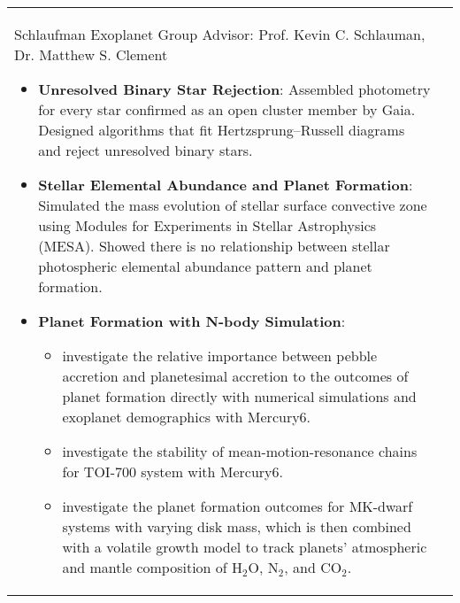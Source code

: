 \documentclass[10pt]{article} %
\begin{document}



\vspace{-0.4cm}

\begin{longtable}{L{4cm}@{\hskip 0.15in}L{13.5cm}} %

{\normalsize Schlaufman Exoplanet Group} %
{Advisor: Prof. Kevin C. Schlauman, Dr. Matthew S. Clement} %
{\begin{itemize}
\vspace{-0.4cm}
    \item \textbf{Unresolved Binary Star Rejection}:  Assembled photometry for every star confirmed as an open cluster member by Gaia. Designed algorithms that fit Hertzsprung–Russell diagrams and reject unresolved binary stars.
    \item \textbf{Stellar Elemental Abundance and Planet Formation}: Simulated the mass evolution of stellar surface convective zone using Modules for Experiments in Stellar Astrophysics (MESA). Showed there is no relationship between stellar photospheric elemental abundance pattern and planet formation.
    \item \textbf{Planet Formation with N-body Simulation}: 
    \begin{itemize}
        \item investigate the relative importance between pebble accretion and planetesimal accretion to the outcomes of planet formation directly with numerical simulations and exoplanet demographics with Mercury6.%
        \item investigate the stability of mean-motion-resonance chains for TOI-700 system with Mercury6.
        \item investigate the planet formation outcomes for MK-dwarf systems with varying disk mass, which is then combined with a volatile growth model to track planets' atmospheric and mantle composition of H$_2$O, N$_2$, and CO$_2$.
    \end{itemize}

\end{itemize}}
\end{longtable}
\end{document}
